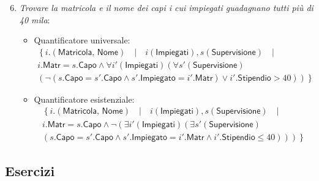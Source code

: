 \documentclass[a4paper]{article}
\begin{document}
	\begin{enumerate}
		\setcounter{enumi}{5}
		\item \emph{Trovare la matricola e il nome dei capi i cui impiegati guadagnano tutti più di 40 mila}:
		\begin{itemize}
			\item Quantificatore universale:
			\begin{gather*}
				\left\{
				i.\left(\textsf{Matricola, Nome}\right) \hspace{1em} | \hspace{1em}
				i\left(\textsf{Impiegati}\right), s\left(\textsf{Supervisione}\right) \hspace{1em} | \hspace{1em} \right. \\
				i.\textsf{Matr} = s.\textsf{Capo} \land \forall i'\left(\textsf{Impiegati}\right) \left(\forall s'\left(\textsf{Supervisione}\right) \right. \\
				\left.\left. \left(\lnot\left(s.\textsf{Capo} = s'.\textsf{Capo} \land s'.\textsf{Impiegato} = i'.\textsf{Matr}\right) \lor i'.\textsf{Stipendio} > 40\right)\right)
				\right\}
			\end{gather*}
		
			\item Quantificatore esistenziale:
			\begin{gather*}
				\left\{
				i.\left(\textsf{Matricola, Nome}\right) \hspace{1em} | \hspace{1em}
				i\left(\textsf{Impiegati}\right), s\left(\textsf{Supervisione}\right) \hspace{1em} | \hspace{1em} \right. \\
				i.\textsf{Matr} = s.\textsf{Capo} \land \lnot \left(\exists i'\left(\textsf{Impiegati}\right) \left(\exists s'\left(\textsf{Supervisione}\right) \right.\right. \\
				\left.\left.\left. \left(s.\textsf{Capo} = s'.\textsf{Capo} \land s'.\textsf{Impiegato} = i'.\textsf{Matr} \land i'.\textsf{Stipendio} \le 40\right)\right)\right)
				\right\}
			\end{gather*}
		\end{itemize}
	\end{enumerate}\newpage

	\subsection{Esercizi}
	
\end{document}
